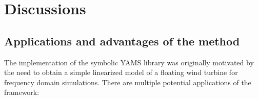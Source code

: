 \documentclass[wes, manuscript]{copernicus}
\begin{document}
\section{Discussions}


\subsection{Applications and advantages of the method}
\label{sec:Applications}\label{sec:Advantages}
The implementation of the symbolic YAMS library was originally motivated by the need to obtain a simple linearized model of a floating wind turbine for frequency domain simulations.
There are multiple potential applications of the framework:
\end{document}
